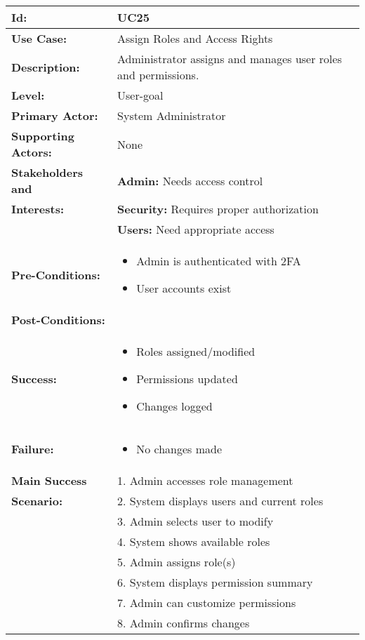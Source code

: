 \documentclass[12pt]{article}
\begin{document}
\begin{tabular}{|p{3cm}|p{11cm}|}
\hline
\textbf{Id:} & UC25 \\
\hline
\textbf{Use Case:} & Assign Roles and Access Rights \\
\hline
\textbf{Description:} & Administrator assigns and manages user roles and permissions. \\
\hline
\textbf{Level:} & User-goal \\
\hline
\textbf{Primary Actor:} & System Administrator \\
\hline
\textbf{Supporting Actors:} & None \\
\hline
\textbf{Stakeholders and} & \textbf{Admin:} Needs access control \\
\textbf{Interests:} & \textbf{Security:} Requires proper authorization \\
& \textbf{Users:} Need appropriate access \\
\hline
\textbf{Pre-Conditions:} & 
\begin{itemize}
    \item Admin is authenticated with 2FA
    \item User accounts exist
\end{itemize} \\
\hline
\textbf{Post-Conditions:} & \\
\textbf{Success:} & 
\begin{itemize}
    \item Roles assigned/modified
    \item Permissions updated
    \item Changes logged
\end{itemize} \\
\textbf{Failure:} & 
\begin{itemize}
    \item No changes made
\end{itemize} \\
\hline
\textbf{Main Success} & 1. Admin accesses role management \\
\textbf{Scenario:} & 2. System displays users and current roles \\
& 3. Admin selects user to modify \\
& 4. System shows available roles \\
& 5. Admin assigns role(s) \\
& 6. System displays permission summary \\
& 7. Admin can customize permissions \\
& 8. Admin confirms changes \\

\end{tabular}
\end{document}
